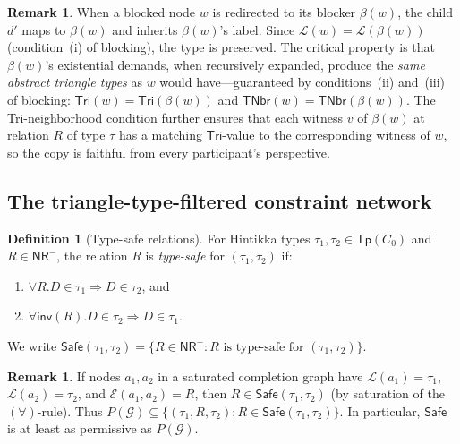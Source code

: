 \documentclass[a4paper,11pt]{article}
\theoremstyle{definition}
\newtheorem{definition}[theorem]{Definition}
\newtheorem{remark}[theorem]{Remark}
\newcommand{\inv}{\ensuremath{\mathsf{inv}}}
\newcommand{\Tp}{\ensuremath{\mathsf{Tp}}}
\newcommand{\NR}{\ensuremath{\mathsf{NR}}}
\newcommand{\Tri}{\ensuremath{\mathsf{Tri}}}
\newcommand{\TNbr}{\ensuremath{\mathsf{TNbr}}}
\newcommand{\Safe}{\ensuremath{\mathsf{Safe}}}
\newcommand{\GG}{\ensuremath{\mathcal{G}}}
\newcommand{\LL}{\ensuremath{\mathcal{L}}}
\newcommand{\EE}{\ensuremath{\mathcal{E}}}
\begin{document}
\begin{remark}
When a blocked node $w$ is redirected to its blocker $\beta(w)$,
the child $d'$ maps to $\beta(w)$ and inherits $\beta(w)$'s
label.  Since $\LL(w) = \LL(\beta(w))$ (condition~(i) of
blocking), the type is preserved.  The critical property is
that $\beta(w)$'s existential demands, when recursively
expanded, produce the \emph{same abstract triangle types} as
$w$ would have---guaranteed by conditions~(ii) and~(iii) of
blocking: $\Tri(w) = \Tri(\beta(w))$ and
$\TNbr(w) = \TNbr(\beta(w))$.  The Tri-neighborhood condition
further ensures that each witness $v$ of $\beta(w)$ at relation
$R$ of type $\tau$ has a matching $\Tri$-value to the
corresponding witness of $w$, so the copy is faithful from
every participant's perspective.
\end{remark}

\subsection{The triangle-type-filtered constraint network}
\label{sec:network}

\begin{definition}[Type-safe relations]\label{def:safe}
For Hintikka types $\tau_1, \tau_2 \in \Tp(C_0)$ and
$R \in \NR^{-}$, the relation $R$ is \emph{type-safe} for
$(\tau_1, \tau_2)$ if:
\begin{enumerate}[nosep,label=(\alph*)]
  \item $\forall R.D \in \tau_1 \Rightarrow D \in \tau_2$, and
  \item $\forall \inv(R).D \in \tau_2 \Rightarrow D \in \tau_1$.
\end{enumerate}
We write $\Safe(\tau_1, \tau_2) = \{R \in \NR^{-} :
R \text{ is type-safe for } (\tau_1, \tau_2)\}$.
\end{definition}

\begin{remark}
If nodes $a_1, a_2$ in a saturated completion graph have
$\LL(a_1) = \tau_1$, $\LL(a_2) = \tau_2$, and
$\EE(a_1, a_2) = R$, then $R \in \Safe(\tau_1, \tau_2)$
(by saturation of the $(\forall)$-rule).  Thus $P(\GG)
\subseteq \{(\tau_1, R, \tau_2) : R \in \Safe(\tau_1,\tau_2)\}$.
In particular, $\Safe$ is at least as permissive as $P(\GG)$.
\end{remark}
\end{document}
